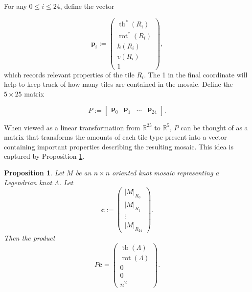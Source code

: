 \documentclass{article}
\DeclareMathOperator{\tb}{tb}
\DeclareMathOperator{\rot}{rot}
\newcommand{\R}{\mathbb{R}}
\newtheorem{prop}{Proposition}
\begin{document}



For any $0\leq i\leq24$, define the vector

$$\textbf{p}_i:=\begin{pmatrix}\tb^*(R_i)\\\rot^*(R_i)\\h(R_i)\\v(R_i)\\1\end{pmatrix},$$
which records relevant properties of the tile $R_i$. The 1 in the final coordinate will help to keep track of how many tiles are contained in the mosaic. Define the $5\times25$ matrix

$$P:=\begin{bmatrix}\textbf{p}_0&\textbf{p}_1&\dots&\textbf{p}_{24}\end{bmatrix}.$$

When viewed as a linear transformation from $\R^{25}$ to $\R^{5}$, $P$ can be thought of as a matrix that transforms the amounts of each tile type present into a vector containing important properties describing the resulting mosaic. This idea is captured by Proposition \ref{prop:P_relavance}.

\begin{prop}\label{prop:P_relavance}
    Let $M$ be an $n\times n$ oriented knot mosaic representing a Legendrian knot $\Lambda$. Let
    $$\textbf{c}:=\begin{pmatrix}|M|_{R_0}\\|M|_{R_1}\\\vdots\\|M|_{R_{24}}\end{pmatrix}.$$
    Then the product
    $$P\textbf{c}=\begin{pmatrix}\tb(\Lambda)\\\rot(\Lambda)\\0\\0\\n^2\end{pmatrix}.$$
\end{prop}
\end{document}
